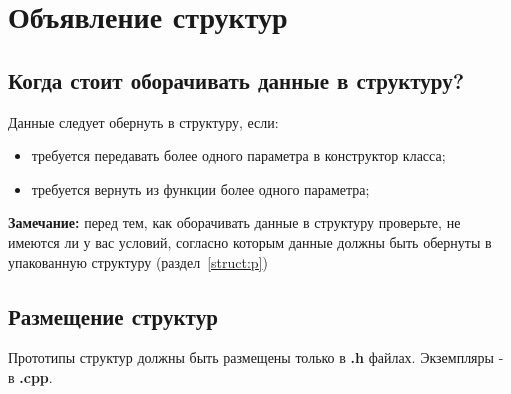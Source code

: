\section{Объявление структур}\label{struct}
\subsection{Когда стоит оборачивать данные в структуру?}
Данные следует обернуть в структуру, если:
\begin{itemize}
	\item требуется передавать более одного параметра в конструктор класса;
	\item требуется вернуть из функции более одного параметра;
\end{itemize}
\textbf{Замечание: }перед тем, как оборачивать данные в структуру проверьте, не имеются ли у вас условий, согласно которым данные должны быть обернуты в упакованную структуру (раздел~\ref{struct:p})
\subsection{Размещение структур}
Прототипы структур должны быть размещены только в \textbf{.h} файлах. Экземпляры - в \textbf{.cpp}.

